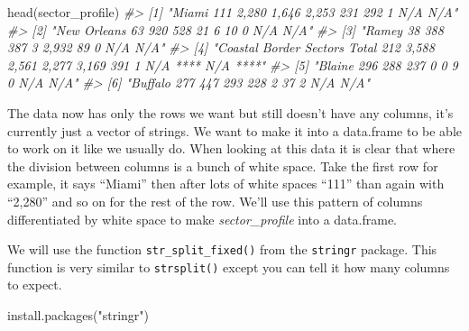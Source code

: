 \documentclass[
  12pt,
]{book}
\newenvironment{Shaded}{\begin{snugshade}}{\end{snugshade}}
\newcommand{\CommentTok}[1]{\textcolor[rgb]{0.37,0.37,0.37}{\textit{#1}}}
\newcommand{\FunctionTok}[1]{\textcolor[rgb]{0,0,0}{#1}}
\newcommand{\NormalTok}[1]{#1}
\newcommand{\StringTok}[1]{\textcolor[rgb]{0.5,0.5,0.5}{#1}}
\begin{document}
\begin{Shaded}
\begin{Highlighting}[]
\FunctionTok{head}\NormalTok{(sector\_profile)}
\CommentTok{\#\textgreater{} [1] "Miami                                             111               2,280                    1,646                   2,253             231              292               1           N/A     N/A"   }
\CommentTok{\#\textgreater{} [2] "New Orleans                                        63                920                      528                      21                6               10               0           N/A     N/A"   }
\CommentTok{\#\textgreater{} [3] "Ramey                                              38                388                      387                       3             2,932              89               0           N/A     N/A"   }
\CommentTok{\#\textgreater{} [4] "Coastal Border Sectors Total                      212               3,588                    2,561                   2,277            3,169             391               1        N/A **** N/A ****"}
\CommentTok{\#\textgreater{} [5] "Blaine                                            296                288                      237                       0                0                9               0           N/A     N/A"   }
\CommentTok{\#\textgreater{} [6] "Buffalo                                           277                447                      293                     228               2                37               2           N/A     N/A"}
\end{Highlighting}
\end{Shaded}

The data now has only the rows we want but still doesn't have any columns, it's currently just a vector of strings. We want to make it into a data.frame to be able to work on it like we usually do. When looking at this data it is clear that where the division between columns is a bunch of white space. Take the first row for example, it says ``Miami'' then after lots of white spaces ``111'' than again with ``2,280'' and so on for the rest of the row. We'll use this pattern of columns differentiated by white space to make \emph{sector\_profile} into a data.frame.

We will use the function \texttt{str\_split\_fixed()} from the \texttt{stringr} package. This function is very similar to \texttt{strsplit()} except you can tell it how many columns to expect.

\begin{Shaded}
\begin{Highlighting}[]
\FunctionTok{install.packages}\NormalTok{(}\StringTok{"stringr"}\NormalTok{)}
\end{Highlighting}
\end{Shaded}
\end{document}
